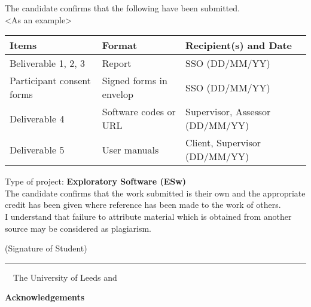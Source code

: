 \frontcover

\clearpage
\noindent The candidate confirms that the following have been submitted.\\
<As an example>
\begin{table}[ht!]
\begin{tabular}{|p{}|p{}|p{}|}
\hline 
Items & Format & Recipient(s) and Date \\ 
\hline 
Beliverable 1, 2, 3 & Report & SSO (DD/MM/YY) \\ 
\hline 
Participant consent forms & Signed forms in envelop & SSO (DD/MM/YY) \\ 
\hline 
Deliverable 4 & Software codes or URL & Supervisor, Assessor (DD/MM/YY) \\ 
\hline 
Deliverable 5 & User manuals & Client, Supervisor (DD/MM/YY) \\ 
\hline 
\end{tabular} 
\end{table}

\noindent Type of project: \textbf{Exploratory Software (ESw)}
\vspace{\fill}\\
\noindent The candidate confirms that the work submitted is their own and the appropriate credit has been given where reference has been made to the work of others.
\vspace{\fill}\\
\noindent I understand that failure to attribute material which is obtained from another source may be considered as plagiarism.
\vspace{\fill}\\
\begin{flushright}
(Signature of Student) \rule{50mm}{1pt}
\end{flushright}
\begin{flushleft}
\vspace{\fill}
\textcopyright~\session~The University of Leeds and~\fullname
\end{flushleft}

\begin{dissertationsummary}

\end{dissertationsummary}

\clearpage
\begin{center}
\textbf{Acknowledgements}
\end{center}


\tableofcontents


